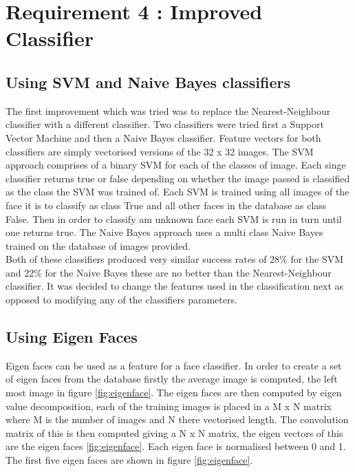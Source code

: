\documentclass{article}
\begin{document}
\section{Requirement 4 : Improved Classifier}

\subsection{Using SVM and Naive Bayes classifiers}

The first improvement which was tried was to replace the Nearest-Neighbour classifier
with a different classifier. Two classifiers were tried first a Support Vector Machine
and then a Naive Bayes classifier. Feature vectors for both classifiers are simply
vectorised versions of the 32 x 32 images. The SVM approach comprises of a binary SVM for
each of the classes of image. Each singe classifier returns true or false depending
on whether the image passed is classified as the class the SVM was trained of.
Each SVM is trained using all images of the face it is to classify as class True
and all other faces in the database as class False. Then in order to classify am
unknown face each SVM is run in turn until one returns true. The Naive Bayes approach
uses a multi class Naive Bayes trained on the database of images provided.\\

Both of these classifiers produced very similar success rates of 28\% for the SVM
and 22\% for the Naive Bayes these are no better than the Nearest-Neighbour classifier.
It was decided to change the features used in the classification next as opposed to
modifying any of the classifiers parameters.\\

\subsection{Using Eigen Faces}

Eigen faces can be used as a feature for a face classifier. In order to create a
set of eigen faces from the database firstly the average image is computed, the
left most image in figure \ref{fig:eigenface}. The eigen faces are then computed
by eigen value decomposition, each of the training images is placed in a M x N
matrix where M is the number of images and N there vectorised length. The convolution
matrix of this is then computed giving a N x N matrix, the eigen vectors of this
are the eigen faces \ref{fig:eigenface}. Each eigen face is normalised between 0 and 1. The first
five eigen faces are shown in figure \ref{fig:eigenface}.\\
\end{document}
